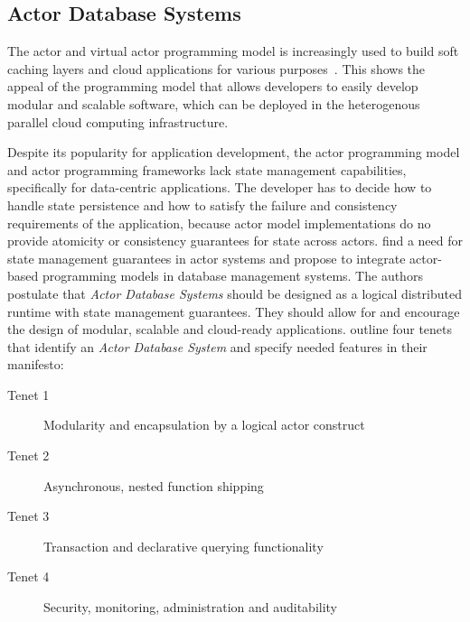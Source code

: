 

  \subsection{Actor Database Systems}
  The actor and virtual actor programming model is increasingly used to build soft caching layers and cloud applications for various purposes~\cite{erlang_uses,akka_uses,orleans_uses}.
  This shows the appeal of the programming model that allows developers to easily develop modular and scalable software, which can be deployed in the heterogenous parallel cloud computing infrastructure.
  
  Despite its popularity for application development, the actor programming model and actor programming frameworks lack state management capabilities, specifically for data-centric applications.
  The developer has to decide how to handle state persistence and how to satisfy the failure and consistency requirements of the application, because actor model implementations do no provide atomicity or consistency guarantees for state across actors.
   find a need for state management guarantees in actor systems and propose to integrate actor-based programming models in database management systems.
  The authors postulate that \textit{Actor Database Systems} should be designed as a logical distributed runtime with state management guarantees.
  They should allow for and encourage the design of modular, scalable and cloud-ready applications.
   outline four tenets that identify an \textit{Actor Database System} and specify needed features in their manifesto:
  \begin{description}
    \item[Tenet 1] Modularity and encapsulation by a logical actor construct
    \item[Tenet 2] Asynchronous, nested function shipping
    \item[Tenet 3] Transaction and declarative querying functionality
    \item[Tenet 4] Security, monitoring, administration and auditability
  \end{description}

